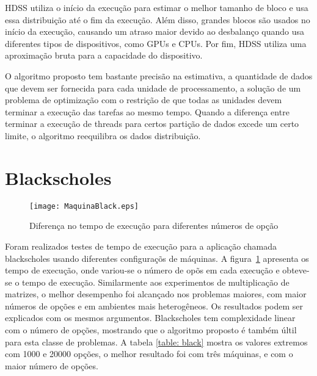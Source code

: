 HDSS utiliza o início da execução para estimar o melhor tamanho de bloco e usa essa distribuição até o fim da execução. Além disso, grandes blocos são usados no início da execução, 
causando um atraso maior devido ao desbalanço quando usa diferentes tipos de dispositivos, 
como GPUs e CPUs. Por fim, HDSS utiliza uma aproximação bruta para a capacidade do dispositivo.

O algoritmo proposto tem  bastante precisão na estimativa,  a quantidade de dados que devem ser 
fornecida para cada unidade de processamento, a solução de um problema de optimização com o 
restrição de que todas as unidades devem terminar a execução das tarefas ao mesmo 
tempo. Quando a diferença entre terminar a execução de threads para certos 
partição de dados excede um certo limite, o algoritmo reequilibra os dados 
distribuição.

\section{Blackscholes}

\begin{figure}[htb]
	\begin{center}
	\centering
			\texttt{[image: MaquinaBlack.eps]}
	\caption{Diferença no tempo de execução para diferentes números de opção}
	\label{fig:black}
	\end{center}
\end{figure}

Foram realizados testes de tempo de execução para a aplicação chamada blackscholes usando diferentes configuraçõs de máquinas. A figura~\ref{fig:black} apresenta os tempo de execução, onde variou-se o número de opõs em cada execução e obteve-se o tempo de execução. Similarmente aos experimentos de multiplicação de matrizes, o melhor desempenho foi alcançado nos problemas maiores, com maior números de opções e em ambientes mais heterogêneos. Os resultados podem ser explicados com os mesmos argumentos. Blackscholes tem complexidade linear com o número de opções, mostrando que o algoritmo proposto é também últil para esta classe de problemas. A tabela  \ref{table: black} mostra os valores extremos com 1000 e 20000 opções, o melhor resultado foi com três máquinas, e com o maior número de opções.


